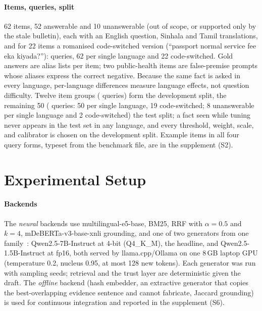 \paragraph{Items, queries, split} 62 items, 52 answerable and 10 unanswerable (out of scope, or supported only by the stale bulletin), each with an English question, Sinhala and Tamil translations, and for 22 items a romanised code-switched version (``passport normal service fee eka kiyada?''): \Lnq{} queries, 62 per single language and 22 code-switched. Gold answers are alias lists per item; two public-health items are false-premise prompts whose aliases express the correct negative. Because the same fact is asked in every language, per-language differences measure language effects, not question difficulty. Twelve item groups (\Lndev{} queries) form the development split, the remaining 50 (\Lntest{} queries: 50 per single language, 19 code-switched; 8 unanswerable per single language and 2 code-switched) the test split; a fact seen while tuning never appears in the test set in any language, and every threshold, weight, scale, and calibrator is chosen on the development split. Example items in all four query forms, typeset from the benchmark file, are in the supplement (S2).



\section{Experimental Setup}\label{sec:setup}
\paragraph{Backends} The \emph{neural} backends use multilingual-e5-base, BM25, RRF with $\alpha{=}0.5$ and $k{=}4$, mDeBERTa-v3-base-xnli grounding, and one of two generators from one family~\cite{qwen2025qwen25}: Qwen2.5-7B-Instruct at 4-bit (Q4\_K\_M), the headline, and Qwen2.5-1.5B-Instruct at fp16, both served by llama.cpp/Ollama on one 8\,GB laptop GPU (temperature 0.2, nucleus 0.95, at most 128 new tokens). Each generator was run with \Lseeds{} sampling seeds; retrieval and the trust layer are deterministic given the draft. The \emph{offline} backend (hash embedder, an extractive generator that copies the best-overlapping evidence sentence and cannot fabricate, Jaccard grounding) is used for continuous integration and reported in the supplement (S6).

